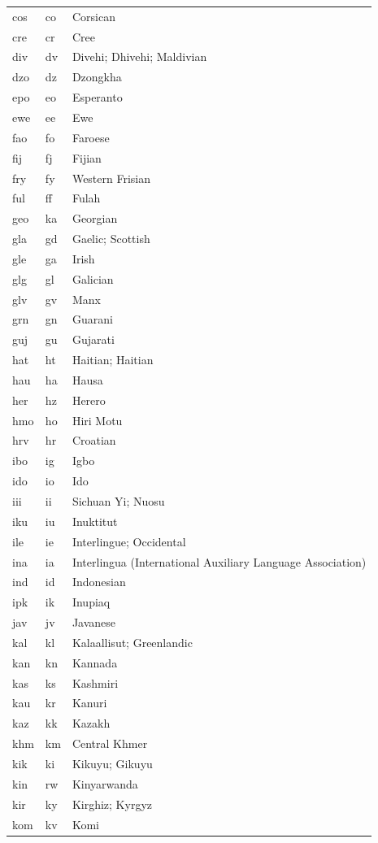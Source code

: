 \documentclass[12pt, twoside]{article}
\begin{document}
\begin{longtable}{|L{3cm}|L{3cm}|L{5cm}|}
cos & co & Corsican\\
cre & cr & Cree\\
div & dv & Divehi; Dhivehi; Maldivian\\
dzo & dz & Dzongkha\\
epo & eo & Esperanto\\
ewe & ee & Ewe\\
fao & fo & Faroese\\
fij & fj & Fijian\\
fry & fy & Western Frisian\\
ful & ff & Fulah\\
geo & ka & Georgian\\
gla & gd & Gaelic; Scottish\\
gle & ga & Irish\\
glg & gl & Galician\\
glv & gv & Manx\\
grn & gn & Guarani\\
guj & gu & Gujarati\\
hat & ht & Haitian; Haitian\\
hau & ha & Hausa\\
her & hz & Herero\\
hmo & ho & Hiri Motu\\
hrv & hr & Croatian\\
ibo & ig & Igbo\\
ido & io & Ido\\
iii & ii & Sichuan Yi; Nuosu\\
iku & iu & Inuktitut\\
ile & ie & Interlingue; Occidental\\
ina & ia & Interlingua (International Auxiliary Language Association)\\
ind & id & Indonesian\\
ipk & ik & Inupiaq\\
jav & jv & Javanese\\
kal & kl & Kalaallisut; Greenlandic\\
kan & kn & Kannada\\
kas & ks & Kashmiri\\
kau & kr & Kanuri\\
kaz & kk & Kazakh\\
khm & km & Central Khmer\\
kik & ki & Kikuyu; Gikuyu\\
kin & rw & Kinyarwanda\\
kir & ky & Kirghiz; Kyrgyz\\
kom & kv & Komi\\

\end{longtable}
\end{document}
